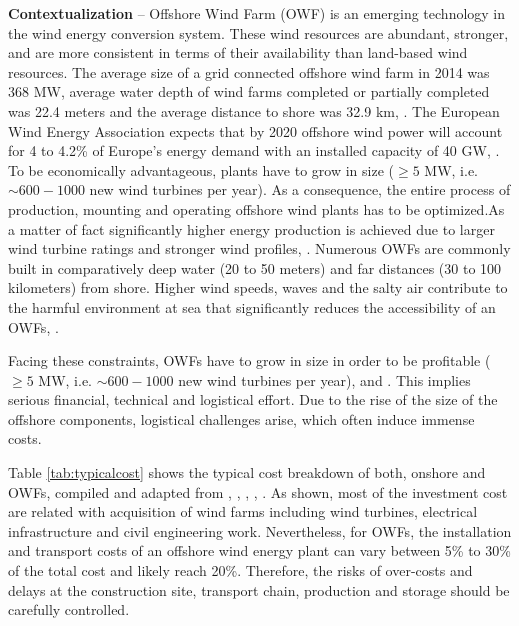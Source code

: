 \textbf{Contextualization} --
Offshore Wind Farm (OWF) is an emerging technology in the wind energy conversion system. These wind resources are abundant, stronger, and are more consistent in terms of their availability than land-based wind resources. The average size of a grid connected offshore wind farm in 2014 was 368 MW, average water depth of wind farms completed or partially completed was 22.4 meters and the average distance to shore was 32.9 km, \cite{Giorgio2015}. The European Wind Energy Association expects that by 2020 offshore wind power will account for 4 to 4.2\% of Europe's energy demand with an installed capacity of 40 GW, \cite{EWEA2011, Kaldellis2013}. To be economically advantageous, plants have to grow in size ($\geq 5$ MW, i.e. $\sim600-1000$ new wind turbines per year). As a consequence, the entire process of production, mounting and operating offshore wind plants has to be optimized.As a matter of fact significantly higher energy production is achieved due to larger wind turbine ratings and stronger wind profiles, \cite{Sun2012298}. Numerous OWFs are commonly built in comparatively deep water (20 to 50 meters) and far distances (30 to 100 kilometers) from shore. Higher wind speeds, waves and the salty air contribute to the harmful environment at sea that significantly reduces the accessibility of an OWFs, \cite{Smit2007}.

Facing these constraints, OWFs have to grow in size in order to be profitable ($\geq 5$ MW, i.e. $\sim600-1000$ new wind turbines per year), \cite{EWEA2011} and \cite{Kaldellis2013}. This implies serious financial, technical and logistical effort. Due to the rise of the size of the offshore components, logistical challenges arise, which often induce immense costs.

Table \ref{tab:typicalcost} shows the typical cost breakdown of both, onshore and OWFs, compiled and adapted from \cite{Henderson2003}, \cite{Junginger2004}, \cite{UK10}, \cite{TCE12}, \cite{IRENA12}. As shown, most of the investment cost are related with acquisition of wind farms including wind turbines, electrical infrastructure and civil engineering work. Nevertheless, for OWFs, the installation and transport costs of an offshore wind energy plant can vary between 5\% to 30\% of the total cost and likely reach 20\%. Therefore, the risks of over-costs and delays at the construction site, transport chain, production and storage should be carefully controlled.
